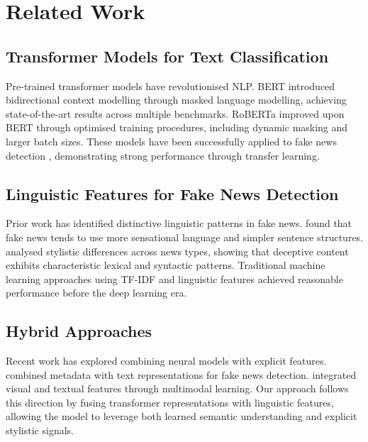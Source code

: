 \documentclass[10pt,twoside]{article}
\begin{document}
\section{Related Work}

\subsection{Transformer Models for Text Classification}

Pre-trained transformer models have revolutionised NLP.
BERT \citep{devlin2019bert} introduced bidirectional context
modelling through masked language modelling, achieving
state-of-the-art results across multiple benchmarks.
RoBERTa \citep{liu2019roberta} improved upon BERT through
optimised training procedures, including dynamic masking and
larger batch sizes.
These models have been successfully applied to fake news
detection \citep{kaliyar2021fakebert}, demonstrating strong
performance through transfer learning.

\subsection{Linguistic Features for Fake News Detection}

Prior work has identified distinctive linguistic patterns in
fake news.
\citet{perez2018automatic} found that fake news tends to use
more sensational language and simpler sentence structures.
\citet{rashkin2017truth} analysed stylistic differences across
news types, showing that deceptive content exhibits
characteristic lexical and syntactic patterns.
Traditional machine learning approaches using TF-IDF and
linguistic features \citep{shu2017fake} achieved reasonable
performance before the deep learning era.

\subsection{Hybrid Approaches}

Recent work has explored combining neural models with explicit
features.
\citet{wang2017liar} combined metadata with text
representations for fake news detection.
\citet{khattar2019mvae} integrated visual and textual features
through multimodal learning.
Our approach follows this direction by fusing transformer
representations with linguistic features, allowing the model
to leverage both learned semantic understanding and explicit
stylistic signals.

\end{document}
